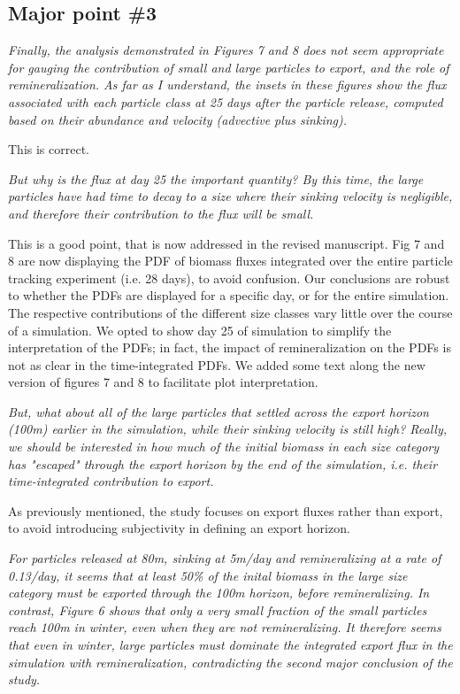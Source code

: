 \documentclass[12pt,letter]{article}
\begin{document}
\subsection*{Major point \#3}
 \textit{Finally, the analysis demonstrated in Figures 7 and 8 does not seem appropriate for gauging the contribution of small and large particles to export, and the role of remineralization. As far as I understand, the insets in these figures show the flux associated with each particle class at 25 days after the particle release, computed based on their abundance and velocity (advective plus sinking).\\}
 
 {\color{red}
This is correct.\\}

 \textit{But why is the flux at day 25 the important quantity? By this time, the large particles have had time to decay to a size where their sinking velocity is negligible, and therefore their contribution to the flux will be small.}
 
 {\color{blue}
 This is a good point, that is now addressed in the revised manuscript. Fig 7 and 8 are now displaying the PDF of biomass fluxes integrated over the entire particle tracking experiment (i.e. 28 days), to avoid confusion. Our conclusions are robust to whether the PDFs are displayed for a specific day, or for the entire simulation. The respective contributions of the different size classes vary little over the course of a simulation. We opted to show day 25 of simulation to simplify the interpretation of the PDFs; in fact, the impact of remineralization on the PDFs is not as clear in the time-integrated PDFs. We added some text along the new version of figures 7 and 8 to facilitate plot interpretation.\\}
 
 \textit{But, what about all of the large particles that settled across the export horizon (100m) earlier in the simulation, while their sinking velocity is still high? Really, we should be interested in how much of the initial biomass in each size category has "escaped" through the export horizon by the end of the simulation, i.e. their time-integrated contribution to export.}
 
 {\color{blue}
 As previously mentioned, the study focuses on export fluxes rather than export, to avoid introducing subjectivity in defining an export horizon.\\}
 
\textit{For particles released at 80m, sinking at 5m/day and remineralizing at a rate of 0.13/day, it seems that at least 50\% of the inital biomass in the large size category must be exported through the 100m horizon, before remineralizing. In contrast, Figure 6 shows that only a very small fraction of the small particles reach 100m in winter, even when they are not remineralizing. It therefore seems that even in winter, large particles must dominate the integrated export flux in the simulation with remineralization, contradicting the second major conclusion of the study.}
\end{document}
